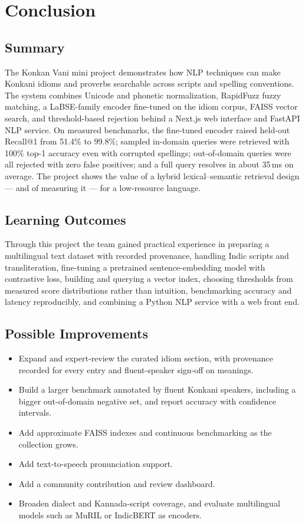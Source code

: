 \documentclass[12pt,a4paper]{article}
\let\oldsection\section
\renewcommand{\section}{\clearpage\oldsection}
\begin{document}
\section{Conclusion}

\subsection{Summary}
The Konkan Vani mini project demonstrates how NLP techniques can make Konkani idioms and proverbs searchable across scripts and spelling conventions. The system combines Unicode and phonetic normalization, RapidFuzz fuzzy matching, a LaBSE-family encoder fine-tuned on the idiom corpus, FAISS vector search, and threshold-based rejection behind a Next.js web interface and FastAPI NLP service. On measured benchmarks, the fine-tuned encoder raised held-out Recall@1 from 51.4\% to 99.8\%; sampled in-domain queries were retrieved with 100\% top-1 accuracy even with corrupted spellings; out-of-domain queries were all rejected with zero false positives; and a full query resolves in about 35\,ms on average. The project shows the value of a hybrid lexical--semantic retrieval design --- and of measuring it --- for a low-resource language.

\subsection{Learning Outcomes}
Through this project the team gained practical experience in preparing a multilingual text dataset with recorded provenance, handling Indic scripts and transliteration, fine-tuning a pretrained sentence-embedding model with contrastive loss, building and querying a vector index, choosing thresholds from measured score distributions rather than intuition, benchmarking accuracy and latency reproducibly, and combining a Python NLP service with a web front end.

\subsection{Possible Improvements}
\begin{itemize}
  \item Expand and expert-review the curated idiom section, with provenance recorded for every entry and fluent-speaker sign-off on meanings.
  \item Build a larger benchmark annotated by fluent Konkani speakers, including a bigger out-of-domain negative set, and report accuracy with confidence intervals.
  \item Add approximate FAISS indexes and continuous benchmarking as the collection grows.
  \item Add text-to-speech pronunciation support.
  \item Add a community contribution and review dashboard.
  \item Broaden dialect and Kannada-script coverage, and evaluate multilingual models such as MuRIL or IndicBERT as encoders.
\end{itemize}
\end{document}

